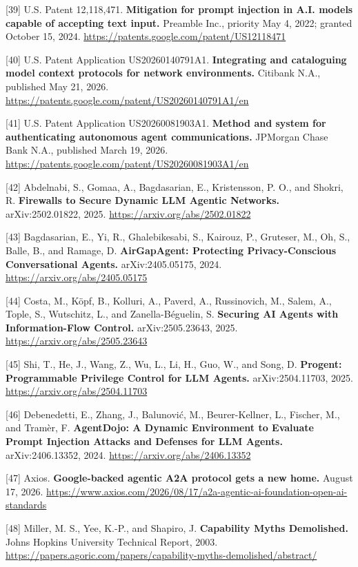 \documentclass[
  10pt,
  letterpaper,
]{article}
\begin{document}
{[}39{]} U.S. Patent 12,118,471. \textbf{Mitigation for prompt injection
in A.I. models capable of accepting text input.} Preamble Inc., priority
May 4, 2022; granted October 15, 2024.
\url{https://patents.google.com/patent/US12118471}

{[}40{]} U.S. Patent Application US20260140791A1. \textbf{Integrating
and cataloguing model context protocols for network environments.}
Citibank N.A., published May 21, 2026.
\url{https://patents.google.com/patent/US20260140791A1/en}

{[}41{]} U.S. Patent Application US20260081903A1. \textbf{Method and
system for authenticating autonomous agent communications.} JPMorgan
Chase Bank N.A., published March 19, 2026.
\url{https://patents.google.com/patent/US20260081903A1/en}

{[}42{]} Abdelnabi, S., Gomaa, A., Bagdasarian, E., Kristensson, P. O.,
and Shokri, R. \textbf{Firewalls to Secure Dynamic LLM Agentic
Networks.} arXiv:2502.01822, 2025.
\url{https://arxiv.org/abs/2502.01822}

{[}43{]} Bagdasarian, E., Yi, R., Ghalebikesabi, S., Kairouz, P.,
Gruteser, M., Oh, S., Balle, B., and Ramage, D. \textbf{AirGapAgent:
Protecting Privacy-Conscious Conversational Agents.} arXiv:2405.05175,
2024. \url{https://arxiv.org/abs/2405.05175}

{[}44{]} Costa, M., Köpf, B., Kolluri, A., Paverd, A., Russinovich, M.,
Salem, A., Tople, S., Wutschitz, L., and Zanella-Béguelin, S.
\textbf{Securing AI Agents with Information-Flow Control.}
arXiv:2505.23643, 2025. \url{https://arxiv.org/abs/2505.23643}

{[}45{]} Shi, T., He, J., Wang, Z., Wu, L., Li, H., Guo, W., and Song,
D. \textbf{Progent: Programmable Privilege Control for LLM Agents.}
arXiv:2504.11703, 2025. \url{https://arxiv.org/abs/2504.11703}

{[}46{]} Debenedetti, E., Zhang, J., Balunović, M., Beurer-Kellner, L.,
Fischer, M., and Tramèr, F. \textbf{AgentDojo: A Dynamic Environment to
Evaluate Prompt Injection Attacks and Defenses for LLM Agents.}
arXiv:2406.13352, 2024. \url{https://arxiv.org/abs/2406.13352}

{[}47{]} Axios. \textbf{Google-backed agentic A2A protocol gets a new
home.} August 17, 2026.
\url{https://www.axios.com/2026/08/17/a2a-agentic-ai-foundation-open-ai-standards}

{[}48{]} Miller, M. S., Yee, K.-P., and Shapiro, J. \textbf{Capability
Myths Demolished.} Johns Hopkins University Technical Report, 2003.
\url{https://papers.agoric.com/papers/capability-myths-demolished/abstract/}
\end{document}
